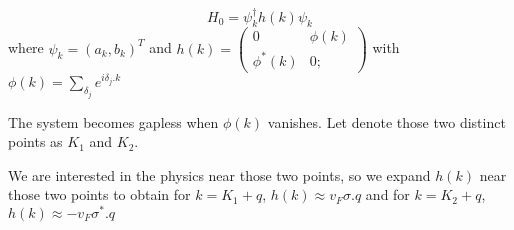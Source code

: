 \documentclass[a4paper,crop=false]{standalone}
\begin{document}
        \begin{equation}
            H_0 = \psi^{\dagger}_{k}h(k)\psi_{k}
        \end{equation}
        where $\psi_k = (a_k,b_k)^{T}$ and $h(k) = \begin{pmatrix}
            0 & \phi(k)\\
            \phi^{*}(k) & 0;
        \end{pmatrix}$ with $\phi(k) = \sum_{\delta_j}e^{i \delta_j . k}$

        The system becomes gapless when $\phi(k)$ vanishes. Let denote those two distinct points as $K_1$ and $K_2$.

        We are interested in the physics near those two points, so we expand $h(k)$ near those two points to obtain
        for $k = K_1 + q$, $h(k) \approx v_F \sigma . q$ and for $k = K_2 + q$, $h(k) \approx - v_F \sigma^* . q$
\end{document}
